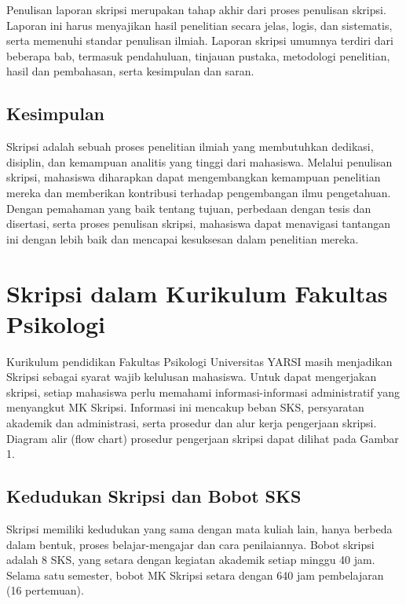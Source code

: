 \documentclass[
  indonesian,
  letterpaper,
]{scrbook}
\begin{document}
Penulisan laporan skripsi merupakan tahap akhir dari proses penulisan
skripsi. Laporan ini harus menyajikan hasil penelitian secara jelas,
logis, dan sistematis, serta memenuhi standar penulisan ilmiah. Laporan
skripsi umumnya terdiri dari beberapa bab, termasuk pendahuluan,
tinjauan pustaka, metodologi penelitian, hasil dan pembahasan, serta
kesimpulan dan saran.

\section*{Kesimpulan}\label{kesimpulan}


Skripsi adalah sebuah proses penelitian ilmiah yang membutuhkan
dedikasi, disiplin, dan kemampuan analitis yang tinggi dari mahasiswa.
Melalui penulisan skripsi, mahasiswa diharapkan dapat mengembangkan
kemampuan penelitian mereka dan memberikan kontribusi terhadap
pengembangan ilmu pengetahuan. Dengan pemahaman yang baik tentang
tujuan, perbedaan dengan tesis dan disertasi, serta proses penulisan
skripsi, mahasiswa dapat menavigasi tantangan ini dengan lebih baik dan
mencapai kesuksesan dalam penelitian mereka.


\chapter{Skripsi dalam Kurikulum Fakultas
Psikologi}\label{skripsi-dalam-kurikulum-fakultas-psikologi}

Kurikulum pendidikan Fakultas Psikologi Universitas YARSI masih
menjadikan Skripsi sebagai syarat wajib kelulusan mahasiswa. Untuk dapat
mengerjakan skripsi, setiap mahasiswa perlu memahami informasi-informasi
administratif yang menyangkut MK Skripsi. Informasi ini mencakup beban
SKS, persyaratan akademik dan administrasi, serta prosedur dan alur
kerja pengerjaan skripsi. Diagram alir (flow chart) prosedur pengerjaan
skripsi dapat dilihat pada Gambar 1.

\section{Kedudukan Skripsi dan Bobot
SKS}\label{kedudukan-skripsi-dan-bobot-sks}

Skripsi memiliki kedudukan yang sama dengan mata kuliah lain, hanya
berbeda dalam bentuk, proses belajar-mengajar dan cara penilaiannya.
Bobot skripsi adalah 8 SKS, yang setara dengan kegiatan akademik setiap
minggu 40 jam. Selama satu semester, bobot MK Skripsi setara dengan 640
jam pembelajaran (16 pertemuan).
\end{document}
